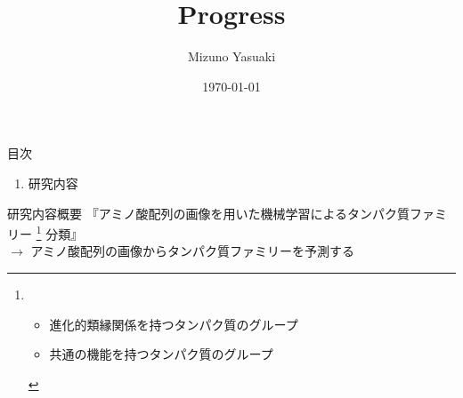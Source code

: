 \documentclass[dvipdfmx]{beamer}
\title{Progress}
\date{\today}
\author{Mizuno Yasuaki}
\begin{document}
  \maketitle
  
  \begin{frame}{目次}
    \begin{enumerate}
      \item 研究内容
    \end{enumerate} 
  \end{frame}

  \begin{frame}{研究内容}{概要}
    『アミノ酸配列の画像を用いた機械学習によるタンパク質ファミリー
    \footnote{
      \begin{itemize}
        \item 進化的類縁関係を持つタンパク質のグループ
        \item 共通の機能を持つタンパク質のグループ
      \end{itemize}
    }
    分類』\\
    $\rightarrow$ アミノ酸配列の画像からタンパク質ファミリーを予測する
  \end{frame}
\end{document}
